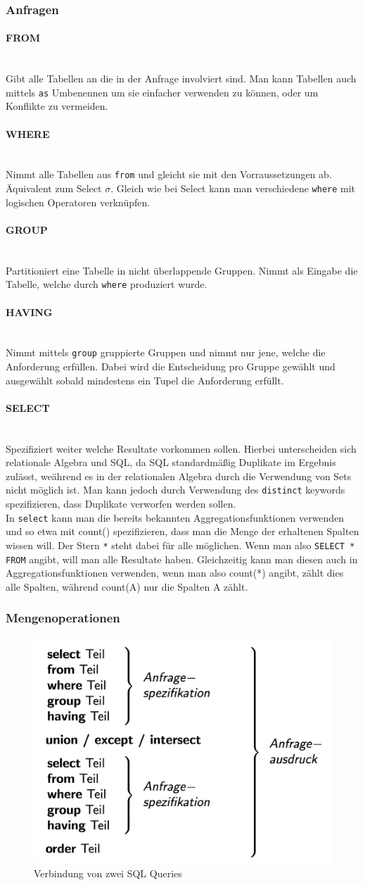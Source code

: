 \documentclass{article}
\newcommand{\paragraphlb}[1]{\paragraph{#1}\mbox{}\\}
\begin{document}
 	\subsubsection{Anfragen}
 	\paragraphlb{FROM}
 	Gibt alle Tabellen an die in der Anfrage involviert sind. Man kann Tabellen auch mittels \verb|as| Umbenennen um sie einfacher verwenden zu können, oder um Konflikte zu vermeiden.
 	\paragraphlb{WHERE}
 	Nimmt alle Tabellen aus \verb|from| und gleicht sie mit den Vorraussetzungen ab. Äquivalent zum Select $\sigma$. Gleich wie bei Select kann man verschiedene \verb|where| mit logischen Operatoren verknüpfen.
 	\paragraphlb{GROUP}
 	Partitioniert eine Tabelle in nicht überlappende Gruppen. Nimmt als Eingabe die Tabelle, welche durch \verb|where| produziert wurde.
 	\paragraphlb{HAVING}
 	Nimmt mittels \verb|group| gruppierte Gruppen und nimmt nur jene, welche die Anforderung erfüllen. Dabei wird die Entscheidung pro Gruppe gewählt und ausgewählt sobald mindestens ein Tupel die Anforderung erfüllt.
 	\paragraphlb{SELECT}
 	Spezifiziert weiter welche Resultate vorkommen sollen. Hierbei unterscheiden sich relationale Algebra und SQL, da SQL standardmäßig Duplikate im Ergebnis zulässt, weährend es in der relationalen Algebra durch die Verwendung von Sets nicht möglich ist. Man kann jedoch durch Verwendung des \verb|distinct| keywords spezifizieren, dass Duplikate verworfen werden sollen. \\
 	In \verb|select| kann man die bereits bekannten Aggregationsfunktionen verwenden und so etwa mit count() spezifizieren, dass man die Menge der erhaltenen Spalten wissen will. Der Stern \verb|*| steht dabei für alle möglichen. Wenn man also \verb|SELECT * FROM| angibt, will man alle Resultate haben. Gleichzeitig kann man diesen auch in Aggregationsfunktionen verwenden, wenn man also count(*) angibt, zählt dies alle Spalten, während count(A) nur die Spalten A zählt. 
 	\subsubsection{Mengenoperationen}
 	\begin{figure}[H]
 	\centering
  \includegraphics[scale=0.3]{Bilder/sql_union.png}
 	\caption{Verbindung von zwei SQL Queries}
 	\end{figure}
 	
\end{document}

